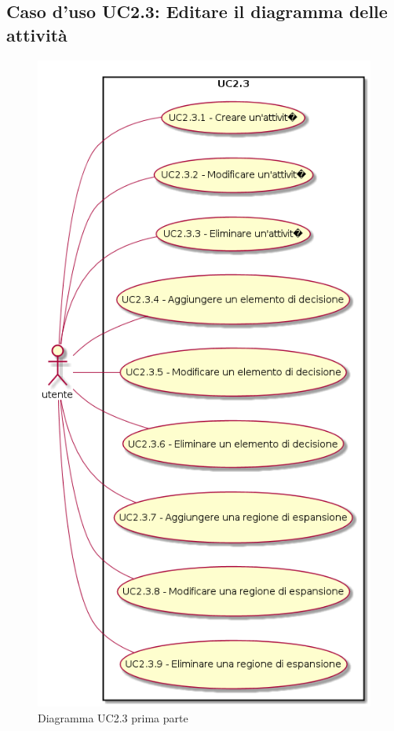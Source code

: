 \documentclass[../AnalisiDeiRequisiti.tex]{subfiles}
\begin{document}
				\subsection{Caso d'uso UC2.3: Editare il diagramma delle attività}
				\begin{figure} [H]
					\centering
					\includegraphics[scale=0.45]{./Figures/UC2.3a.png}
					\caption{Diagramma UC2.3 prima parte}\label{}
				\end{figure}
\end{document}
